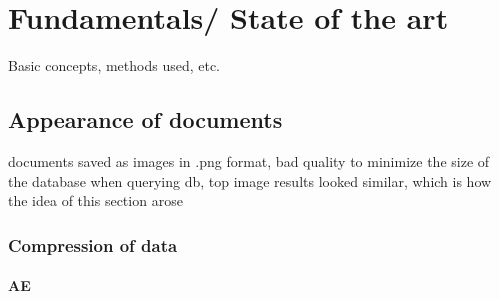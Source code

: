 \chapter{Fundamentals/ State of the art}\label{ch:methodology}

\cite{InformationRetrieval1999}

Basic concepts, methods used, etc.
















\section{Appearance of documents}\label{sec:appearance}
documents saved as images in .png format, bad quality to minimize the size of the database
when querying db, top image results looked similar, which is how the idea of this section arose

\subsection{Compression of data}\label{subsec:compression}
\subsubsection{AE}\label{subsec:autoencoder}





